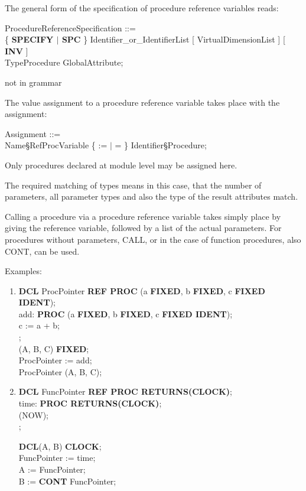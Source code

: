 The general form of the specification of procedure reference variables
reads:

\begin{front}
ProcedureReferenceSpecification ::= \\
\x \{ {\bf SPECIFY $\mid$ SPC} \} Identifier\_or\_IdentifierList [ VirtualDimensionList ] [ {\bf INV} ]\\
 TypeProcedure GlobalAttribute;
\end{front}
\begin{grammar}
not in grammar
\end{grammar}

The value assignment to a procedure reference variable takes place with
the assignment:

\begin{front}
Assignment ::=\\
\x Name\S RefProcVariable \{ := $\mid$ = \} Identifier\S Procedure;
\end{front}
\begin{grammar}

\end{grammar}

Only procedures declared at module level may be assigned here.

The required matching of types means in this case, that the number of
parameters, all parameter types and also the type of the result
attributes match.

Calling a procedure via a procedure reference variable takes simply
place by giving the reference variable, followed by a list of the actual
parameters. For procedures without parameters, CALL, or in the case of
function procedures, also CONT, can be used.

Examples:
\begin{enumerate}
\item {\bf DCL} ProcPointer {\bf REF PROC} (a {\bf FIXED}, b {\bf FIXED}, c {\bf FIXED IDENT});\\
      add: {\bf PROC} (a {\bf FIXED}, b {\bf FIXED}, c {\bf FIXED IDENT});\\
      \x   c := a + b;\\
      ;\\
       (A, B, C) {\bf FIXED};\\
      ProcPointer := add;\\
      ProcPointer (A, B, C);
\item {\bf DCL} FuncPointer {\bf REF PROC RETURNS(CLOCK)};\\
      time: {\bf PROC RETURNS(CLOCK)};\\
      (NOW);\\
      ;

      {\bf DCL}(A, B) {\bf CLOCK};\\
      FuncPointer := time;\\
      A := FuncPointer;\\
      B := {\bf CONT} FuncPointer;
\end{enumerate}

